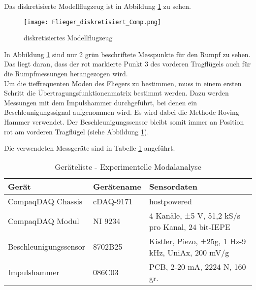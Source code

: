     \noindent
    Das diskretisierte Modellflugzeug ist in Abbildung
    \ref{fig: Flieger_diskretisiert} zu sehen.

    \begin{figure}[H]
        \centering
        \texttt{[image: Flieger\_diskretisiert\_Comp.png]}
        \caption{diskretisiertes Modellflugzeug}
        \label{fig: Flieger_diskretisiert}
    \end{figure}

    \noindent
    In Abbildung \ref{fig: Flieger_diskretisiert} sind nur 2 grün beschriftete
    Messpunkte für den Rumpf zu sehen. Das liegt daran, dass der rot markierte
    Punkt 3 des vorderen Tragflügels auch für die Rumpfmessungen herangezogen
    wird.
    \\

    \noindent
    Um die tieffrequenten Moden des Fliegers zu bestimmen, muss in einem ersten
    Schritt die Übertragungsfunktionenmatrix bestimmt werden. Dazu werden
    Messungen mit dem Impulshammer durchgeführt, bei denen ein
    Beschleunigungssignal aufgenommen wird. Es wird dabei die Methode Roving
    Hammer verwendet. Der Beschleunigungssensor bleibt somit immer an Position
     rot\grqq \hspace{0.05cm} am vorderen Tragflügel (siehe Abbildung
    \ref{fig: Flieger_diskretisiert}).

    \noindent
    Die verwendeten Messgeräte sind in Tabelle \ref{tab: Geräteliste_EMA}
    angeführt.

    \begin{table}[H]
        \centering
        \begin{tabular}{|l|l|p{6cm}|}
            \hline
            \textbf{Gerät}  &   \textbf{Gerätename}   &   \textbf{Sensordaten} \\
            \hline \hline
            CompaqDAQ Chassis & cDAQ-9171 & hostpowered \\
            \hline
            CompaqDAQ Modul & NI 9234 & 4 Kanäle, ±5 V, 51,2 kS/s pro Kanal, 24 bit-IEPE  \\
            \hline
            Beschleunigungssensor & 8702B25 & Kistler, Piezo, ±25g, 1 Hz-9 kHz, UniAx, 200 mV/g  \\
            \hline
            Impulshammer & 086C03 & PCB, 2-20 mA, 2224 N, 160 gr.  \\
            \hline
        \end{tabular}
        \caption{Geräteliste - Experimentelle Modalanalyse}
        \label{tab: Geräteliste_EMA}
    \end{table}    

